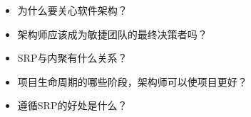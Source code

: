 \begin{itemize}
\item 为什么要关心软件架构？
\item 架构师应该成为敏捷团队的最终决策者吗？
\item SRP与内聚有什么关系？
\item 项目生命周期的哪些阶段，架构师可以使项目更好？
\item 遵循SRP的好处是什么？
\end{itemize}